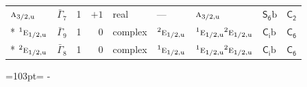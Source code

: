 \documentclass[10pt,a4paper]{article}
\newcommand{\needspace}[1]{\par\penalty-100\begingroup\dimen0=#1\relax\dimen2=\pagegoal
  \advance\dimen2-\pagetotal\ifdim\dimen0>\dimen2\relax\ifdim\dimen2>0pt\vfil\break\fi\fi
  \endgroup}
\numberwithin{equation}{section}
\newcommand{\grp}[1]{\mathsf{#1}}
\newcommand{\irr}[1]{\text{\normalfont\scshape #1}}
\newcommand{\conjpair}[1]{{}^{#1}}
\newcommand{\ptag}[1]{\mathrm{#1}}
\newcommand{\secondclass}{\mathrm{b}}
\begin{document}
{\begin{longtable}{@{}llrrlllll@{}}
$\irr{a}_{3/2,\ptag{u}}$ & $\bar{\Gamma}_{7}$ & 1 & $+1$ & real & --- & $\irr{a}_{3/2,\ptag{u}}$ & \href{S6b.pdf}{$\grp{S_{6}}\secondclass$} & \href{../../../rotation/data/pdf/C2.pdf}{$\grp{C_{2}}$}\\*
$\conjpair{1}\irr{e}_{1/2,\ptag{u}}$ & $\bar{\Gamma}_{9}$ & 1 & $0$ & complex & $\conjpair{2}\irr{e}_{1/2,\ptag{u}}$ & $\conjpair{1}\irr{e}_{1/2,\ptag{u}}\conjpair{2}\irr{e}_{1/2,\ptag{u}}$ & \href{S2b.pdf}{$\grp{C_{i}}\secondclass$} & \href{../../../rotation/data/pdf/C6.pdf}{$\grp{C_{6}}$}\\*
$\conjpair{2}\irr{e}_{1/2,\ptag{u}}$ & $\bar{\Gamma}_{8}$ & 1 & $0$ & complex & $\conjpair{1}\irr{e}_{1/2,\ptag{u}}$ & $\conjpair{1}\irr{e}_{1/2,\ptag{u}}\conjpair{2}\irr{e}_{1/2,\ptag{u}}$ & \href{S2b.pdf}{$\grp{C_{i}}\secondclass$} & \href{../../../rotation/data/pdf/C6.pdf}{$\grp{C_{6}}$}\\
\bottomrule\end{longtable}}
\needspace{103pt}
\end{document}
